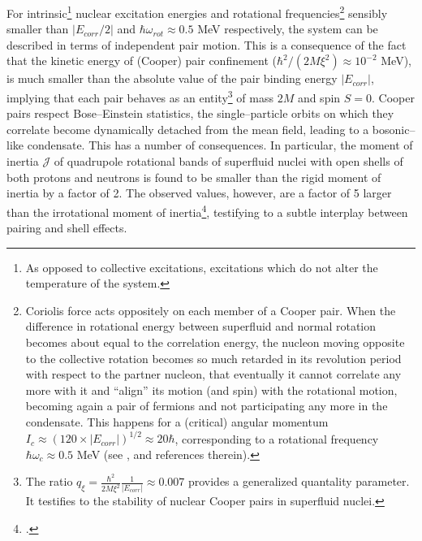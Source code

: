 For intrinsic\footnote{As opposed to collective excitations, excitations which do not alter the temperature of the system.} nuclear excitation energies and rotational frequencies\footnote{Coriolis force acts oppositely on each member of a Cooper pair. When the difference in rotational energy between superfluid and normal rotation becomes about equal to the correlation energy, the nucleon moving opposite to the collective rotation becomes so much retarded in its revolution period with respect to the partner nucleon, that eventually it cannot correlate any more with it and ``align'' its motion (and spin) with the rotational motion, becoming again a pair of fermions and not participating any more in the condensate. This happens for a (critical) angular momentum $I_c\approx(120\times|E_{corr}|)^{1/2}\approx 20\hbar$, corresponding to a rotational frequency $\hbar\omega_c\approx 0.5$ MeV (see \cite{Bohr:75}, \cite{Brink:05} and references therein).} sensibly smaller than $|E_{corr}/2|$ and $\hbar\omega_{rot}\approx0.5$ MeV respectively, the system can be described in terms of independent pair motion. This is a consequence of the fact that the kinetic energy of (Cooper) pair confinement ($\hbar^2/(2M\xi^2)\approx 10^{-2}$ MeV), is much smaller than the absolute value of the pair binding energy $|E_{corr}|$, implying that each pair behaves as an entity\footnote{The ratio $q_\xi=\frac{\hbar^2}{2M\xi^2}\frac{1}{|E_{corr}|}\approx 0.007$ provides a generalized quantality parameter. It testifies to the stability of nuclear Cooper pairs in superfluid nuclei.} of mass $2M$ and spin $S=0$. Cooper pairs respect Bose--Einstein statistics, the single--particle orbits on which they correlate become dynamically detached from the mean field, leading to a bosonic--like condensate. This has a number of consequences. In particular, the moment of inertia $\mathcal J$ of quadrupole rotational bands of superfluid nuclei with open shells of both protons and neutrons is found to be smaller than the rigid moment of inertia by a factor of 2. The observed values, however, are a factor of 5 larger than the irrotational moment of inertia\footnote{\cite{Bohr:75,Belyaev:59,Belyaev:13}.}, testifying to a subtle interplay between pairing and shell effects.
